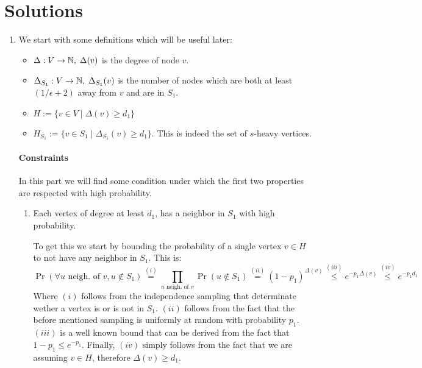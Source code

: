 \documentclass[11pt]{article}
\begin{document}
\section*{Solutions}
\begin{enumerate}
    \item We start with some definitions which will be useful later:
    \begin{itemize}
        \item $\Delta: V \to \mathbb{N},\;\Delta (v) $ is the degree of node $v$.
        \item $\Delta_{S_1}: V \to \mathbb{N},\;\Delta_{S_1} (v) $ is the number of nodes which are both at least $\left(1/\epsilon + 2\right)$ away from $v$ and are in $S_1$.
        \item $H := \{v\in V \mid \Delta (v) \geq d_1\}$
        \item $H_{S_1} := \{v\in S_1 \mid \Delta_{S_1} (v) \geq d_1\}$. This is indeed the set of $s$-heavy vertices.
    \end{itemize}
    \paragraph*{Constraints} In this part we will find some condition under which the first two properties are respected with high probability. 
    \begin{enumerate}
        \item Each vertex of degree at least $d_1$, has a neighbor in $S_1$ with high probability. 
        
        To get this we start by bounding the probability of a single vertex $v \in H$ to not have any neighbor in $S_1$. This is:
        \begin{equation*}
            \Pr\left(\forall u \text{ neigh. of }v, u \notin S_1\right) \stackrel{(i)}{=} \prod_{u \text{ neigh. of }v} \Pr\left(u \notin S_1\right) \stackrel{(ii)}{=} (1-p_1)^{\Delta(v)} \stackrel{(iii)}{\leq} e^{-p_1\Delta(v)} \stackrel{(iv)}{\leq} e^{-p_1d_1}
        \end{equation*}
        Where $(i)$ follows from the independence sampling that determinate wether a vertex is or is not in $S_1$. $(ii)$ follows from the fact that the before mentioned sampling is uniformly at random with probability $p_1$. $(iii)$ is a well known bound that can be derived from the fact that $1-p_1 \leq e^{-p_1}$. Finally, $(iv)$ simply follows from the fact that we are assuming $v \in H$, therefore $\Delta(v)\geq d_1$.


\end{enumerate}
\end{enumerate}
\end{document}
